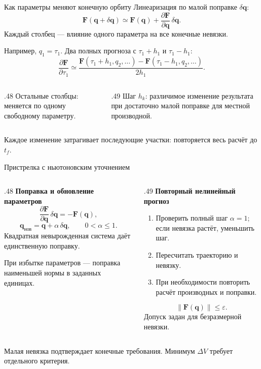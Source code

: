 \documentclass[11pt,aspectratio=169,t]{beamer}
\newcommand{\eqcompact}{\fontsize{10}{12}\selectfont}
\newcommand{\derivationmathspacing}{%
  \setlength{\abovedisplayskip}{2pt}%
  \setlength{\belowdisplayskip}{3pt}%
  \setlength{\abovedisplayshortskip}{2pt}%
  \setlength{\belowdisplayshortskip}{2pt}%
  \setlength{\jot}{2pt}}
\newcommand{\vect}[1]{\boldsymbol{#1}}
\begin{document}
\begin{frame}{Как параметры меняют конечную орбиту}
\relax\derivationmathspacing
Линеаризация по малой поправке $\delta\vect q$:
{\eqcompact\derivationmathspacing
\[
 \vect F(\vect q+\delta\vect q)\simeq
 \vect F(\vect q)+\frac{\partial\vect F}{\partial\vect q}\,\delta\vect q.
\]
}
Каждый столбец --- влияние одного параметра на все конечные невязки.
\par\smallskip
Например, $q_1=\tau_1$. Два полных прогноза с $\tau_1+h_1$ и $\tau_1-h_1$:
{\eqcompact\derivationmathspacing
\[
 \frac{\partial\vect F}{\partial\tau_1}\simeq
 \frac{\vect F(\tau_1+h_1,q_2,\ldots)
      -\vect F(\tau_1-h_1,q_2,\ldots)}{2h_1}.
\]
}
\begin{columns}[T,onlytextwidth]
\begin{column}{.48\textwidth}
Остальные столбцы: меняется по одному свободному параметру.
\end{column}
\begin{column}{.49\textwidth}
Шаг $h_k$: различимое изменение результата при достаточно
малой поправке для местной производной.
\end{column}
\end{columns}
\par\smallskip
Каждое изменение затрагивает последующие участки:
повторяется весь расчёт до $t_f$.
\end{frame}

\begin{frame}{Пристрелка с ньютоновским уточнением}
\relax\derivationmathspacing
\begin{columns}[T,onlytextwidth]
\begin{column}{.48\textwidth}
\textbf{Поправка и обновление параметров}
{\eqcompact\derivationmathspacing
\[
 \frac{\partial\vect F}{\partial\vect q}\,\delta\vect q=-\vect F(\vect q),
\]
\[
 \vect q_{\text{нов}}=\vect q+\alpha\,\delta\vect q,
 \qquad 0<\alpha\leqslant1.
\]
}
Квадратная невырожденная система даёт единственную поправку.
\par\smallskip
При избытке параметров --- поправка наименьшей нормы
в заданных единицах.
\end{column}
\begin{column}{.49\textwidth}
\textbf{Повторный нелинейный прогноз}
\begin{enumerate}
\setlength{\itemsep}{2pt}
\item Проверить полный шаг $\alpha=1$;
если невязка растёт, уменьшить шаг.
\item Пересчитать траекторию и невязку.
\item При необходимости повторить расчёт производных и поправки.
\end{enumerate}
{\eqcompact\derivationmathspacing
\[
 \boxed{\|\vect F(\vect q)\|\leqslant\varepsilon.}
\]
}
Допуск задан для безразмерной невязки.
\end{column}
\end{columns}
\par\smallskip
Малая невязка подтверждает конечные требования.
Минимум $\Delta V$ требует отдельного критерия.
\end{frame}
\end{document}
